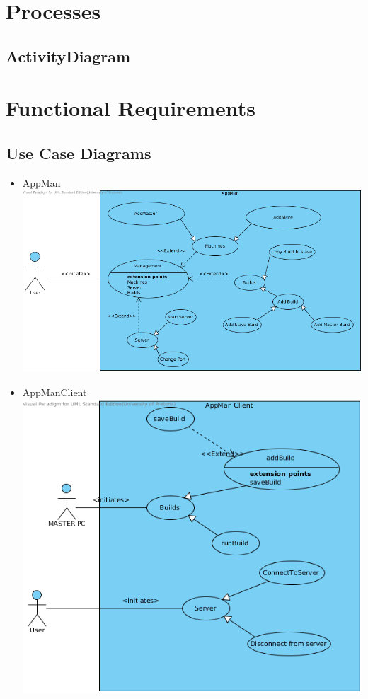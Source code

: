 \documentclass[a4paper,12pt,final]{article}
\begin{document}
\section{Processes}
\subsection{ActivityDiagram}

\section{Functional Requirements}
\subsection{Use Case Diagrams}
\begin{itemize}
\item AppMan\\
\includegraphics[scale=0.5]{UseCaseDiagram.png} 
\item AppManClient\\
\includegraphics[scale=0.6]{UseCaseDiagramClient.png} 
\end{itemize}
\end{document}
